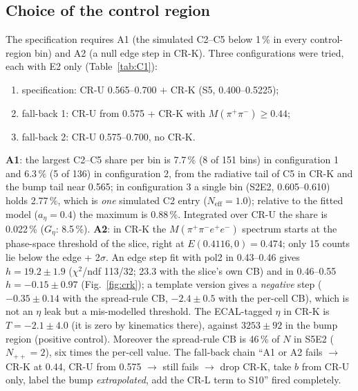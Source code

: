 \documentclass[11pt,a4paper]{article}
\newcommand{\Mfour}{\ensuremath{M(\pi^{+}\pi^{-}e^{+}e^{-})}\xspace}
\newcommand{\Mpipi}{\ensuremath{M(\pi^{+}\pi^{-})}\xspace}
\newcommand{\code}[1]{\texttt{\detokenize{#1}}}
\newcommand{\aEta}{\ensuremath{a_\eta}\xspace}
\newcommand{\Geta}{\ensuremath{G_\eta}\xspace}
\newcommand{\tabin}[1]{}
\begin{document}
\subsection{Choice of the control region}
\label{sec:crchoice}
The specification requires A1 (the simulated C2--C5 below 1\,\% in every control-region bin) and A2 (a null edge step in CR-K). Three
configurations were tried, each with E2 only (Table~\ref{tab:C1}):
\begin{enumerate}\setlength{\itemsep}{0pt}
\item specification: CR-U 0.565--0.700 + CR-K (S5, 0.400--0.5225);
\item fall-back 1: CR-U from 0.575 + CR-K with \Mpipi$\ge0.44$;
\item fall-back 2: CR-U 0.575--0.700, no CR-K.
\end{enumerate}
\textbf{A1}: the largest C2--C5 share per bin is 7.7\,\% (8 of 151 bins) in configuration 1 and 6.3\,\% (5 of 136) in configuration 2,
from the radiative tail of C5 in CR-K and the bump tail near 0.565; in configuration 3 a single bin (S2E2, 0.605--0.610) holds 2.77\,\%,
which is \emph{one} simulated C2 entry ($N_{\mathrm{eff}}=1.0$); relative to the fitted model ($\aEta=0.4$) the maximum is 0.88\,\%. Integrated
over CR-U the share is 0.022\,\% (\Geta: 8.5\,\%). \textbf{A2}: in CR-K the \Mfour spectrum starts at the phase-space threshold of the
slice, right at $E(0.4116,0)=0.474$; only 15 counts lie below the edge + 2$\sigma$. An edge step fit with pol2 in 0.43--0.46 gives
$h=19.2\pm1.9$ ($\chi^2$/ndf 113/32; 23.3 with the slice's own CB) and in 0.46--0.55 $h=-0.15\pm0.97$ (Fig.~\ref{fig:crk}); a template
version gives a \emph{negative} step ($-0.35\pm0.14$ with the spread-rule CB, $-2.4\pm0.5$ with the per-cell CB), which is not an $\eta$
leak but a mis-modelled threshold. The ECAL-tagged $\eta$ in CR-K is $T=-2.1\pm4.0$ (it is zero by kinematics there), against
$3253\pm92$ in the bump region (positive control). Moreover the spread-rule CB is 46\,\% of $N$ in S5E2 ($N_{++}=2$), six times the
per-cell value. The fall-back chain ``A1 or A2 fails $\to$ CR-K at 0.44, CR-U from 0.575 $\to$ still fails $\to$ drop CR-K, take $b$ from
CR-U only, label the bump \emph{extrapolated}, add the CR-L term to S10'' fired completely.

\begin{table}[H]
\centering
\caption{Spec.\ Table~C1: candidate control regions with their content and verdict. Data S0, isBest $\ge0$, raw counts; CB spread rule;
simulation SMASH mode A, $w\times$V3. Columns: counts $N$, CB/$N$, share of the simulated C2--C5 and of \Geta, $(N-\mathrm{CB})/T_{12}$ at
SMASH. Source: WP3 (\code{wp3_tableC1.txt}). Fall-backs: CR-K at 0.44, then dropped; CR-U from 0.575.}
\label{tab:C1}
\footnotesize
\setlength{\tabcolsep}{3pt}
\resizebox{\textwidth}{!}{\tabin{fix_tC1_ra4.tex}}
\end{table}
\end{document}
